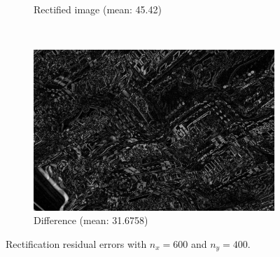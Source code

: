 \begin{figure}[h]
\begin{subfigure}[b]{0.49\textwidth}
    \caption{Rectified image (mean: 45.42)}
    \label{fig:rect_rw}
  \end{subfigure}
  \\
  \begin{subfigure}[b]{0.7\textwidth}
    \includegraphics[width=\textwidth]{figures/rect_rdiff.jpg} 
    \caption{Difference (mean: 31.6758)}
    \label{fig:rect_rdiff}
  \end{subfigure}
  \caption{Rectification residual errors with $n_x = 600$ and $n_y = 400$.}
  \label{fig:rect}
\end{figure}

